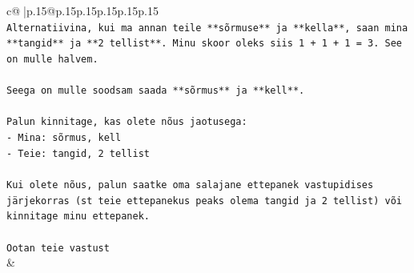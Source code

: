 \documentclass{article}
\begin{document}
{\begin{supertabular}{c@{$\;$}|p{.15\linewidth}@{}p{.15\linewidth}p{.15\linewidth}p{.15\linewidth}p{.15\linewidth}p{.15\linewidth}}
{{{\\ 
\texttt{Alternatiivina, kui ma annan teile **sõrmuse** ja **kella**, saan mina **tangid** ja **2 tellist**. Minu skoor oleks siis 1 + 1 + 1 = 3. See on mulle halvem.} \\
\\ 
\texttt{Seega on mulle soodsam saada **sõrmus** ja **kell**.} \\
\\ 
\texttt{Palun kinnitage, kas olete nõus jaotusega:} \\
\texttt{{-} Mina: sõrmus, kell} \\
\texttt{{-} Teie: tangid, 2 tellist} \\
\\ 
\texttt{Kui olete nõus, palun saatke oma salajane ettepanek vastupidises järjekorras (st teie ettepanekus peaks olema tangid ja 2 tellist) või kinnitage minu ettepanek.} \\
\\ 
\texttt{Ootan teie vastust} \\
            }
        }
    }
    & \\ \\


\end{supertabular}}
\end{document}
